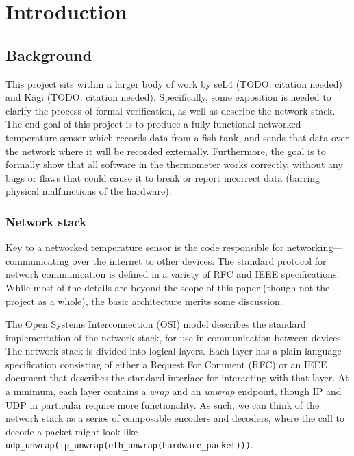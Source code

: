 \documentclass[twoside]{memoir}
\begin{document}
\tableofcontents


\mainmatter

\chapter{Introduction}

\section{Background}

This project sits within a larger body of work by seL4 (TODO: citation needed) and K{\"a}gi (TODO: citation needed).
Specifically, some exposition is needed to clarify the process of
formal verification, as well as describe the network stack.
The end goal of this project is to produce a fully functional
networked temperature sensor which records data from a fish tank,
and sends that data over the network where it will be recorded externally.
Furthermore, the goal is to formally show that all software in the
thermometer works correctly, without any bugs or flaws that could cause
it to break or report incorrect data (barring physical malfunctions of the hardware).

\subsection{Network stack}
Key to a networked temperature sensor is the code responsible for networking---communicating over the internet to other devices.
The standard protocol for network communication is defined in
a variety of RFC and IEEE specifications.
While most of the details are beyond the scope of this paper
(though not the project as a whole), the basic architecture merits some
discussion.

The Open Systems Interconnection (OSI) model describes the standard
implementation of the network stack, for use in communication between
devices.
The network stack is divided into logical layers.
Each layer has a plain-language specification
consisting of either a Request For Comment (RFC) or an IEEE document
that describes the standard interface for interacting with that layer.
At a minimum, each layer contains a \textit{wrap} and an \textit{unwrap}
endpoint, though IP and UDP in particular require more functionality.
As such, we can think of the network stack as a series of composable
encoders and decoders,
where the call to decode a packet might look like
\lstinline{udp_unwrap(ip_unwrap(eth_unwrap(hardware_packet)))}.
\end{document}
